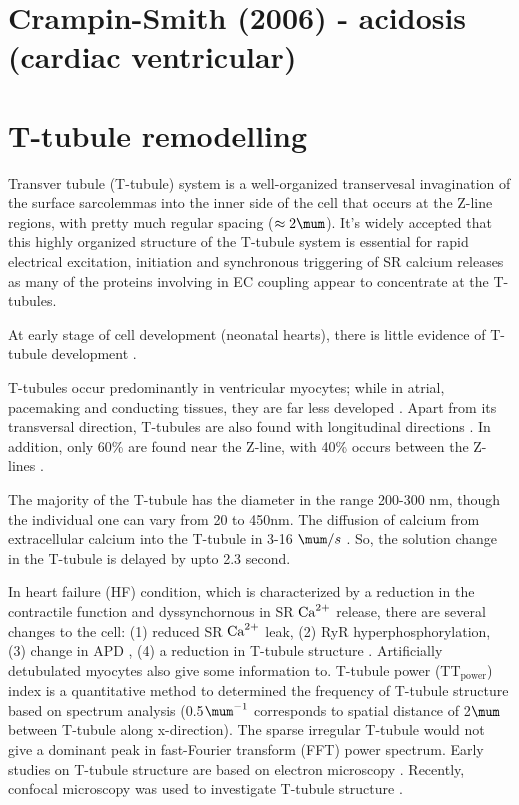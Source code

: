 \section{Crampin-Smith (2006) - acidosis (cardiac ventricular)}
\label{sec:crampin-smith_06}

\citep{crampin2006, crampin2006am} 

\section{T-tubule remodelling}
\label{sec:T-tubule_remodelling}

Transver tubule (T-tubule) system is a well-organized transervesal invagination
of the surface sarcolemmas into the inner side of the cell that occurs at the
Z-line regions, with pretty much regular spacing ($\approx 2\mum$). It's widely
accepted that this highly organized structure of the T-tubule system is
essential for rapid electrical excitation, initiation and synchronous triggering
of SR calcium releases as many of the proteins involving in EC coupling appear
to concentrate at the T-tubules.

\begin{framed}
At early stage of cell development (neonatal hearts), there is little evidence
of T-tubule development \citep{brette2003}.

T-tubules occur predominantly in ventricular myocytes; while in atrial,
pacemaking and conducting tissues, they are far less developed
\citep{ayettey1978}. Apart from its transversal direction, T-tubules are also
found with longitudinal directions \citep{13}. In addition, only 60\% are found
near the Z-line, with 40\% occurs between the Z-lines \citep{brette2003}. 

The majority of the T-tubule has the diameter in the range 200-300 nm, though
the individual one can vary from 20 to 450nm. The diffusion of calcium from
extracellular calcium into the T-tubule in 3-16 $\mum/s$ \citep{blatter1998}. 
So, the solution change in the T-tubule is delayed by upto 2.3 second.
\end{framed}

In heart failure (HF) condition, which is characterized by a reduction in the
contractile function and dyssynchornous in SR ${\text{Ca}^{2+}}$ release, there are several
changes to the cell: (1) reduced SR ${\text{Ca}^{2+}}$ leak, (2) RyR hyperphosphorylation,
(3) change in APD \citep{7-10}, (4) a reduction in T-tubule structure
\citep{11-16}. Artificially detubulated myocytes \citep{17-18} also give some
information to.  T-tubule power (TT$_\text{power}$) index is a quantitative
method to determined the frequency of T-tubule structure based on spectrum
analysis (0.5$\mum^{-1}$ corresponds to spatial distance of 2$\mum$ between
T-tubule along x-direction). The sparse irregular T-tubule would not give a
dominant peak in fast-Fourier transform (FFT) power spectrum. Early studies on
T-tubule structure are based on electron microscopy \citep{23,24,25}. Recently,
confocal microscopy was used to investigate T-tubule structure \citep{11-15,
26-33}.

